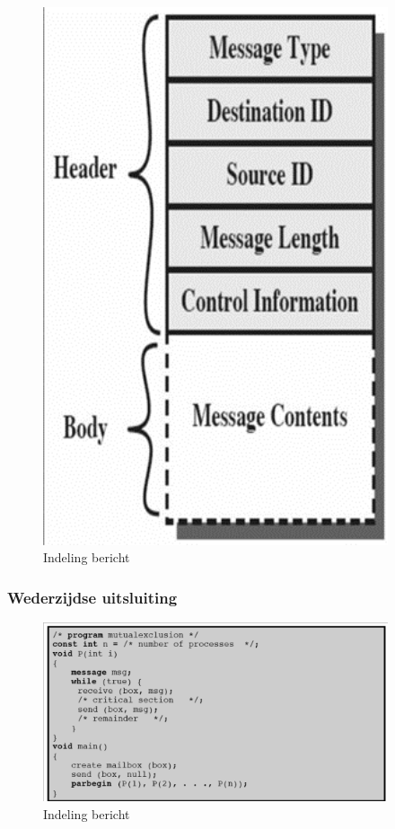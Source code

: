 \begin{figure}[htp]
    \centering
            \includegraphics[width=4in]{img/indelingbericht.png}
        \caption{Indeling bericht}
    \label{fig:Indeling bericht}
\end{figure}

\subsubsection{Wederzijdse uitsluiting}

\begin{figure}[htp]
    \centering
            \includegraphics[width=4in]{img/mutualexclusionmessage.png}
        \caption{Indeling bericht}
    \label{fig:Indeling bericht}
\end{figure}

